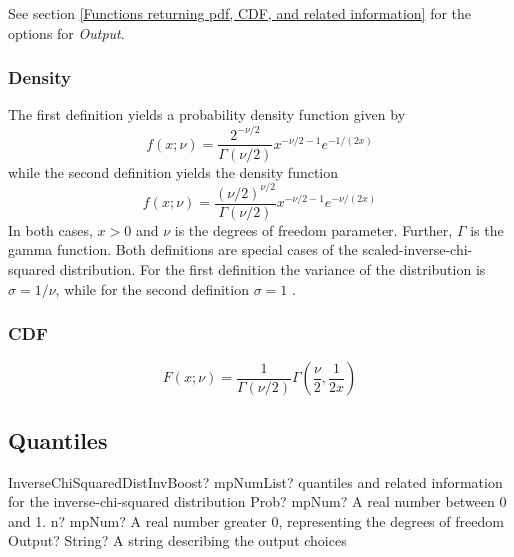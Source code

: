 \vspace{0.3cm}
See section \ref{Functions returning pdf, CDF, and related information} for the options for {\itshape\sffamily Output}. 


\subsubsection{Density}
\label{InverseChiSquaredDistributionDensity}

The first definition yields a probability density function given by
\begin{equation} 
	f(x;\nu)= \frac{2^{-\nu/2}}{\Gamma(\nu /2)} x^{-\nu/2-1} e^{-1/(2x)}
\end{equation}
while the second definition yields the density function
\begin{equation} 
	f(x;\nu)= \frac{(\nu/2)^{\nu/2}}{\Gamma(\nu /2)} x^{-\nu/2-1} e^{-\nu/(2x)}
\end{equation}
In both cases, $x>0$  and  $\nu$  is the degrees of freedom parameter. Further, $\Gamma$ is the gamma function. Both definitions are special cases of the scaled-inverse-chi-squared distribution. For the first definition the variance of the distribution is $\sigma=1/\nu$, while for the second definition $\sigma=1$ .



\subsubsection{CDF}
\begin{equation} 
	F(x;\nu)= \frac{1}{\Gamma(\nu /2)} \Gamma\left(\frac{\nu}{2},\frac{1}{2x}\right) 
\end{equation}



\subsection{Quantiles}


\begin{mpFunctionsExtract}
	\mpFunctionThreeNotImplemented
	{InverseChiSquaredDistInvBoost? mpNumList? quantiles and related information for the inverse-chi-squared distribution}
	{Prob? mpNum? A real number between 0 and 1.}
	{n? mpNum? A real number greater 0, representing the degrees of freedom}
	{Output? String? A string describing the output choices}
\end{mpFunctionsExtract}

